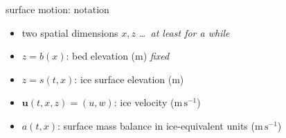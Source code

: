 \documentclass[10pt,dvipsnames]{beamer}
\newcommand{\bu}{\mathbf{u}}
\newcommand{\comm}[1]{{\footnotesize \hfill \emph{#1}}}
\begin{document}
\begin{frame}{surface motion: notation}
\begin{center}
\end{center}

\vspace{-3mm}
\begin{itemize}
\item two spatial dimensions $x,z$ \comm{\dots\, at least for a while}
\item $z = b(x)$: bed elevation (m) \comm{fixed}
\item $z = s(t,x)$: ice surface elevation (m)
\item $\bu(t,x,z)=(u,w)$: ice velocity ($\text{m}\,\text{s}^{-1}$)
\item $a(t,x)$: surface mass balance in ice-equivalent units ($\text{m}\,\text{s}^{-1}$)
\end{itemize}
\end{frame}
\end{document}
